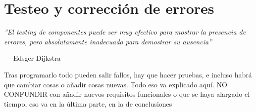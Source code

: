 \chapter{Testeo y corrección de errores}

\epigraph{\textit{''El testing de componentes puede ser muy efectivo para mostrar la presencia de errores, pero absolutamente inadecuado para demostrar su ausencia''}}{--- Edsger Dijkstra}

{\color{red} Tras programarlo todo pueden salir fallos, hay que hacer pruebas, e incluso habrá que cambiar cosas o añadir cosas nuevas. Todo eso va explicado aquí. NO CONFUNDIR con añadir nuevos requisitos funcionales o que se haya alargado el tiempo, eso va en la última parte, en la de conclusiones}